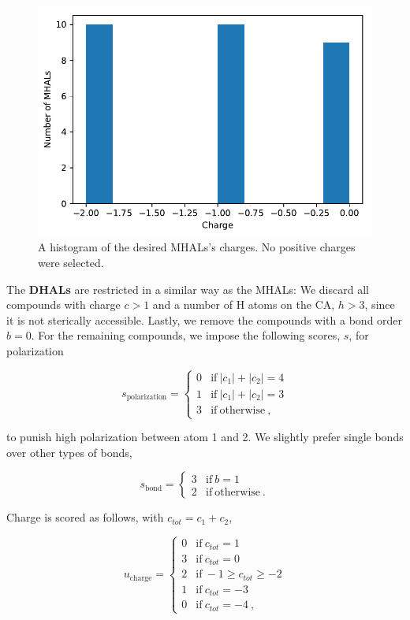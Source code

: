 \begin{figure}[]{}
\centering
\includegraphics[width=.7\linewidth]{img/mhal_ss_hist_charge.pdf} 
\caption{A histogram of the desired MHALs's charges. No positive charges were selected.}
\label{fig:mhalhist_charge}
\end{figure}

The \textbf{DHALs} are restricted in a similar way as the MHALs: We discard all compounds with charge $c > 1$ and a number of H atoms on the CA, $h > 3$, since it is not sterically accessible. Lastly, we remove the compounds with a bond order $b = 0$. For the remaining compounds, we impose the following scores, $s$, for polarization

\begin{equation}
	s_{\textrm{polarization}} = 
	\begin{cases}
	0	&	\mathrm{if}~ |c_1| + |c_2| = 4 \\
	1	&	\mathrm{if}~ |c_1| + |c_2| = 3 \\
	3   &	\mathrm{if}~ \mathrm{otherwise} ~,
	\end{cases}
\end{equation}

to punish high polarization between atom 1 and 2. We slightly prefer single bonds over other types of bonds,

\begin{equation}
	s_{\textrm{bond}} = 
	\begin{cases}
	3	&	\mathrm{if}~ b = 1 \\
	2	&	\mathrm{if}~ \textrm{otherwise} ~.
	\end{cases}
\end{equation}

Charge is scored as follows, with $c_{tot} = c_1 + c_2$,

\begin{equation}
u_{\textrm{charge}} = 
\begin{cases}
0	&	\mathrm{if}~ c_{tot} = 1 \\
3	&	\mathrm{if}~ c_{tot} = 0 \\
2   &	\mathrm{if}~ -1 \geq c_{tot} \geq -2 \\
1   &	\mathrm{if}~ c_{tot} = -3 \\
0   &	\mathrm{if}~ c_{tot} = -4 ~,
\end{cases}
\end{equation}

